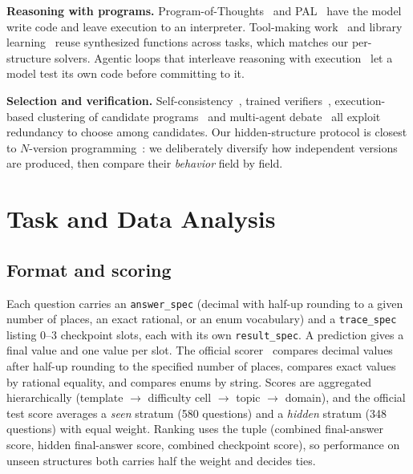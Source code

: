 \documentclass[conference]{IEEEtran}
\begin{document}
\textbf{Reasoning with programs.} Program-of-Thoughts~\cite{chen2023pot} and PAL~\cite{gao2023pal} have the model write
code and leave execution to an interpreter. Tool-making work~\cite{cai2024toolmakers} and library learning~\cite{ellis2021dreamcoder}
reuse synthesized functions across tasks, which matches our per-structure solvers. Agentic loops that interleave reasoning
with execution~\cite{yao2023react} let a model test its own code before committing to it.

\textbf{Selection and verification.} Self-consistency~\cite{wang2023selfconsistency}, trained
verifiers~\cite{cobbe2021verifiers,lightman2024verify}, execution-based clustering of candidate
programs~\cite{li2022alphacode,chen2023codet} and multi-agent debate~\cite{du2024debate} all exploit redundancy to choose
among candidates. Our hidden-structure protocol is closest to $N$-version programming~\cite{avizienis1985nversion}: we
deliberately diversify how independent versions are produced, then compare their \emph{behavior} field by field.

\section{Task and Data Analysis}\label{sec:data}
\subsection{Format and scoring}
Each question carries an \texttt{answer\_spec} (decimal with half-up rounding to a given number of places, an exact
rational, or an enum vocabulary) and a \texttt{trace\_spec} listing 0--3 checkpoint slots, each with its own
\texttt{result\_spec}. A prediction gives a final value and one value per slot. The official
scorer~\cite{finreason2026task1overview} compares decimal values after half-up rounding to the specified number of
places, compares exact values by rational equality, and compares enums by string. Scores are aggregated
hierarchically (template $\rightarrow$ difficulty cell $\rightarrow$ topic $\rightarrow$ domain), and the official test score
averages a \emph{seen} stratum (580 questions) and a \emph{hidden} stratum (348 questions) with equal weight. Ranking uses
the tuple (combined final-answer score, hidden final-answer score, combined checkpoint score), so performance on unseen
structures both carries half the weight and decides ties.
\end{document}
